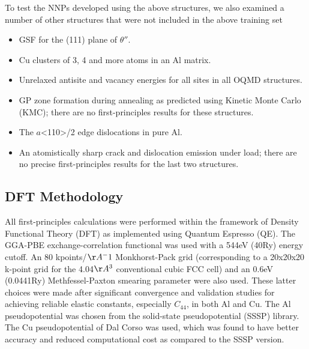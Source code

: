 \documentclass{article}
\begin{document}
To test the NNPs developed using the above structures, we also examined a number of other structures that were not included in the above training set
\begin{itemize}
  
    \item GSF for the (111) plane of $\theta''$.
    \item Cu clusters of 3, 4 and more atoms in an Al matrix. 
    \item Unrelaxed antisite and vacancy energies for all sites in all OQMD structures. 
    \item GP zone formation during annealing as predicted using Kinetic Monte Carlo (KMC); there are no first-principles results for these structures.   
    \item The $a$<110>/2 edge dislocations in pure Al.
    \item An atomistically sharp crack and dislocation emission under load;
    there are no precise first-principles results for the last two structures. 
\end{itemize}


\subsection{DFT Methodology} \label{sct:dft_calcsettings_and_methods}

All first-principles calculations were performed within the framework of Density Functional Theory (DFT) as implemented
using Quantum Espresso\cite{Giannozzi2009} (QE).  The GGA-PBE\cite{Perdew1996} exchange-correlation functional was used with a
544eV (40Ry) energy cutoff.  An 80 kpoints/$\AA^-1$ Monkhorst-Pack grid\cite{Pack1977SpecialIntegrations} 
(corresponding to a 20x20x20 k-point grid for the 4.04$\AA^3$ conventional cubic FCC cell) and an 0.6eV (0.0441Ry) Methfessel-Paxton smearing parameter \cite{Methfessel1989High-precisionMetals} were also used.  These latter choices were made after significant convergence and validation studies for achieving reliable elastic constants, especially $C_{44}$, in both Al and Cu.  The Al pseudopotential was chosen from the solid-state pseudopotential (SSSP) library\cite{Prandini2018}.  The Cu pseudopotential of Dal Corso\cite{DalCorso2014} was used, which was found to have better 
accuracy and reduced computational cost as compared to the SSSP version.
\end{document}
